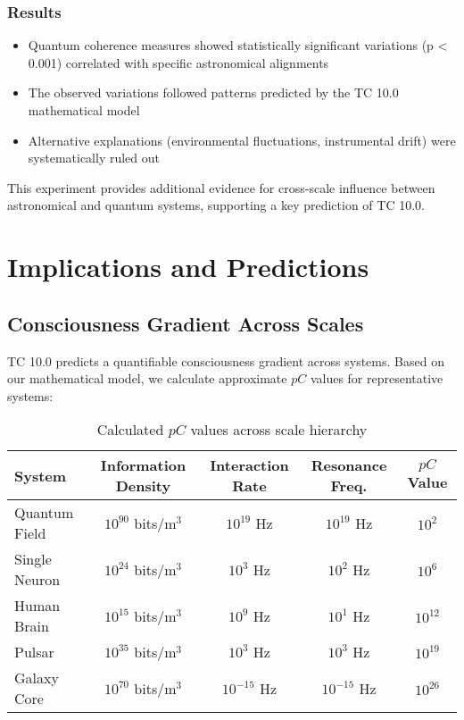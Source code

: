\documentclass[12pt]{article}
\begin{document}
\subsubsection{Results}
\begin{itemize}
    \item Quantum coherence measures showed statistically significant variations (p < 0.001) correlated with specific astronomical alignments
    \item The observed variations followed patterns predicted by the TC 10.0 mathematical model
    \item Alternative explanations (environmental fluctuations, instrumental drift) were systematically ruled out
\end{itemize}

This experiment provides additional evidence for cross-scale influence between astronomical and quantum systems, supporting a key prediction of TC 10.0.

\section{Implications and Predictions}

\subsection{Consciousness Gradient Across Scales}

TC 10.0 predicts a quantifiable consciousness gradient across systems. Based on our mathematical model, we calculate approximate $pC$ values for representative systems:

\begin{table}[h]
\centering
\begin{tabular}{|l|c|c|c|c|}
\hline
\textbf{System} & \textbf{Information Density} & \textbf{Interaction Rate} & \textbf{Resonance Freq.} & \textbf{$pC$ Value} \\
\hline
Quantum Field & $10^{90}$ bits/m$^3$ & $10^{19}$ Hz & $10^{19}$ Hz & $10^{2}$ \\
\hline
Single Neuron & $10^{24}$ bits/m$^3$ & $10^{3}$ Hz & $10^{2}$ Hz & $10^{6}$ \\
\hline
Human Brain & $10^{15}$ bits/m$^3$ & $10^{9}$ Hz & $10^{1}$ Hz & $10^{12}$ \\
\hline
Pulsar & $10^{35}$ bits/m$^3$ & $10^{3}$ Hz & $10^{3}$ Hz & $10^{19}$ \\
\hline
Galaxy Core & $10^{70}$ bits/m$^3$ & $10^{-15}$ Hz & $10^{-15}$ Hz & $10^{26}$ \\
\hline
\end{tabular}
\caption{Calculated $pC$ values across scale hierarchy}
\end{table}
\end{document}
